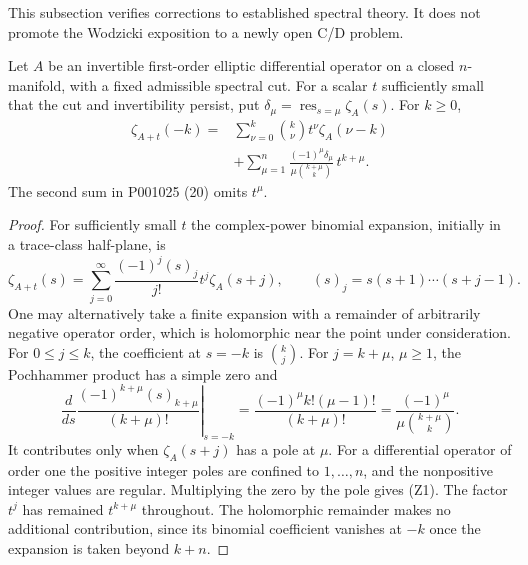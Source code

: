 This subsection verifies corrections to established spectral theory. It
does not promote the Wodzicki exposition to a newly open C/D problem.

\begin{proposition}\ours
Let \(A\) be an invertible first-order elliptic differential operator on a
closed \(n\)-manifold, with a fixed admissible spectral cut. For a scalar
\(t\) sufficiently small that the cut and invertibility persist, put
\(\delta_\mu=\operatorname*{res}_{s=\mu}\zeta_A(s)\). For \(k\ge0\),
\[
\begin{split}
 \zeta_{A+t}(-k)={}&\sum_{\nu=0}^{k}\binom{k}{\nu}t^\nu\zeta_A(\nu-k)\\
 &+\sum_{\mu=1}^{n}
 \frac{(-1)^\mu\delta_\mu}{\mu\binom{k+\mu}{k}}\,t^{k+\mu}.
\end{split}
\tag{Z1}
\]
The second sum in P001025 (20) omits \(t^\mu\).
\end{proposition}
\begin{proof}
For sufficiently small \(t\) the complex-power binomial expansion,
initially in a trace-class half-plane, is
\[
 \zeta_{A+t}(s)=\sum_{j=0}^\infty
       \frac{(-1)^j(s)_j}{j!}t^j\zeta_A(s+j),
 \qquad (s)_j=s(s+1)\cdots(s+j-1).
\]
One may alternatively take a finite expansion with a remainder of
arbitrarily negative operator order, which is holomorphic near the point
under consideration. For \(0\le j\le k\), the coefficient at
\(s=-k\) is \(\binom{k}{j}\). For \(j=k+\mu\), \(\mu\ge1\),
the Pochhammer product has a simple zero and
\[
 \left.\frac{d}{ds}\frac{(-1)^{k+\mu}(s)_{k+\mu}}{(k+\mu)!}
 \right|_{s=-k}
 =\frac{(-1)^\mu k!(\mu-1)!}{(k+\mu)!}
 =\frac{(-1)^\mu}{\mu\binom{k+\mu}{k}}.
\]
It contributes only when \(\zeta_A(s+j)\) has a pole at \(\mu\).
For a differential operator of order one the positive integer poles are
confined to \(1,\ldots,n\), and the nonpositive integer values are
regular. Multiplying the zero by the pole gives (Z1). The factor \(t^j\)
has remained \(t^{k+\mu}\) throughout. The holomorphic remainder makes
no additional contribution, since its binomial coefficient vanishes at
\(-k\) once the expansion is taken beyond \(k+n\).
\end{proof}

